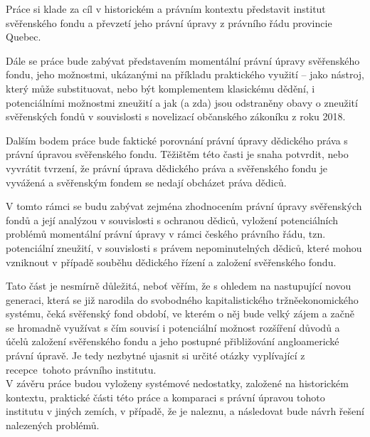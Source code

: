 \documentclass{article}
\begin{document}
Práce si klade za cíl v historickém a právním kontextu představit institut svěřenského fondu a převzetí jeho právní úpravy z právního řádu provincie Quebec.
\linebreak

\indent Dále se práce bude zabývat představením momentální právní úpravy svěřens\-kého fondu, jeho možnostmi, ukázanými na příkladu praktického využití – jako nástroj, který může substituovat, nebo být komplementem klasickému dědění, i potenciálními možnostmi zneužití a jak (a zda) jsou odstraněny obavy o zneužití svěřenských fondů v souvislosti s novelizací občanského zákoníku z roku 2018.
\linebreak

\indent Dalším bodem práce bude faktické porovnání právní úpravy dědického práva s právní úpravou svěřenského fondu. Těžištěm této časti je snaha potvrdit, nebo vyvrátit tvrzení, že právní úprava dědického práva a svěřenského fondu je vyvážená a svěřenským fondem se nedají obcházet práva dědiců.
\linebreak

\indent V tomto rámci se budu zabývat zejména zhodnocením právní úpravy svěřens\-kých fondů a její analýzou v souvislosti s ochranou dědiců, vyložení potenciálních problémů momentální právní úpravy v rámci českého právního řádu, tzn. potenciální zneužití, v souvislosti s právem nepominutelných dědiců, které mohou vzniknout v případě souběhu dědického řízení a založení svěřenského fondu.
\linebreak

\indent Tato část je nesmírně důležitá, neboť věřím, že s ohledem na nastupující novou generaci, která se již narodila do svobodného kapitalistického tržněekonomic\-kého systému, čeká svěřenský fond období, ve kterém o něj bude velký zájem a začně se hromadně využívat s čím souvisí i potenciální možnost rozšíření důvodů a účelů založení svěřenského fondu a jeho postupné přibližování angloamerické právní úpravě. Je tedy nezbytné ujasnit si určité otázky vyplívající z recepce\ tohoto právního institutu. \\

\indent V závěru práce budou vyloženy systémové nedostatky, založené na historickém kontextu, praktické části této práce a komparaci s právní úpravou tohoto institutu v jiných zemích, v případě, že je naleznu, a následovat bude návrh řešení nalezených problémů.
\end{document}
